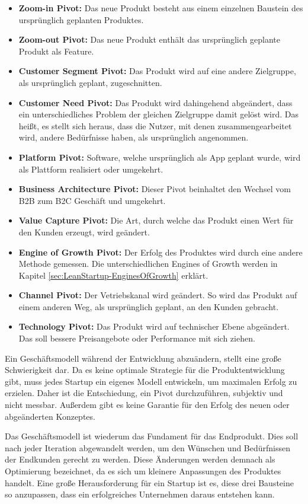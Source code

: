 \begin{itemize}
	\item \textbf{Zoom-in Pivot:} Das neue Produkt besteht aus einem einzelnen Baustein des ursprünglich geplanten Produktes.
	\item \textbf{Zoom-out Pivot:} Das neue Produkt enthält das ursprünglich geplante Produkt als Feature.
	\item \textbf{Customer Segment Pivot:} Das Produkt wird auf eine andere Zielgruppe, als ursprünglich geplant, zugeschnitten.
	\item \textbf{Customer Need Pivot:} Das Produkt wird dahingehend abgeändert, dass ein unterschiedliches Problem der gleichen Zielgruppe damit gelöst wird. Das heißt, es stellt sich heraus, dass die Nutzer, mit denen zusammengearbeitet wird, andere Bedürfnisse haben, als ursprünglich angenommen.
	\item \textbf{Platform Pivot:} Software, welche ursprünglich als App geplant wurde, wird als Plattform realisiert oder umgekehrt.
	\item \textbf{Business Architecture Pivot:} Dieser Pivot beinhaltet den Wechsel vom B2B zum B2C Geschäft und umgekehrt.
	\item \textbf{Value Capture Pivot:} Die Art, durch welche das Produkt einen Wert für den Kunden erzeugt, wird geändert. 
	\item \textbf{Engine of Growth Pivot:} Der Erfolg des Produktes wird durch eine andere Methode gemessen. Die unterschiedlichen Engines of Growth werden in Kapitel \ref{sec:LeanStartup-EnginesOfGrowth} erklärt.
	\item \textbf{Channel Pivot:} Der Vetriebskanal wird geändert. So wird das Produkt auf einem anderen Weg, als ursprünglich geplant, an den Kunden gebracht.
	\item \textbf{Technology Pivot:} Das Produkt wird auf technischer Ebene abgeändert. Das soll bessere Preisangebote oder Performance mit sich ziehen.
\end{itemize}
Ein Geschäftsmodell während der Entwicklung abzuändern, stellt eine große Schwierigkeit dar. Da es keine optimale Strategie für die Produktentwicklung gibt, muss jedes Startup ein eigenes Modell entwickeln, um maximalen Erfolg zu erzielen. Daher ist die Entschiedung, ein Pivot durchzuführen, subjektiv und nicht messbar. Außerdem gibt es keine Garantie für den Erfolg des neuen oder abgeänderten Konzeptes. 

Das Geschäftsmodell ist wiederum das Fundament für das Endprodukt. Dies soll nach jeder Iteration abgewandelt werden, um den Wünschen und Bedürfnissen der Endkunden gerecht zu werden. Diese Änderungen werden demnach als Optimierung bezeichnet, da es sich um kleinere Anpassungen des Produktes handelt. Eine große Herausforderung für ein Startup ist es, diese drei Bausteine so anzupassen, dass ein erfolgreiches Unternehmen daraus entstehen kann.

